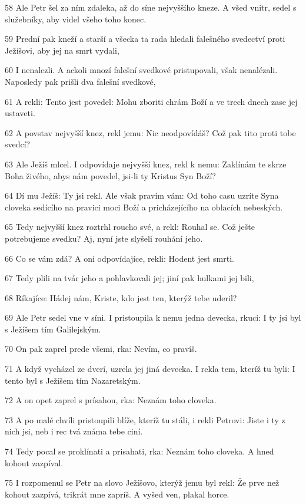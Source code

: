 \par 58 Ale Petr šel za ním zdaleka, až do síne nejvyššího kneze. A všed vnitr, sedel s služebníky, aby videl všeho toho konec.
\par 59 Prední pak kneží a starší a všecka ta rada hledali falešného svedectví proti Ježíšovi, aby jej na smrt vydali,
\par 60 I nenalezli. A ackoli mnozí falešní svedkové pristupovali, však nenalézali. Naposledy pak prišli dva falešní svedkové,
\par 61 A rekli: Tento jest povedel: Mohu zboriti chrám Boží a ve trech dnech zase jej ustaveti.
\par 62 A povstav nejvyšší knez, rekl jemu: Nic neodpovídáš? Což pak tito proti tobe svedcí?
\par 63 Ale Ježíš mlcel. I odpovídaje nejvyšší knez, rekl k nemu: Zaklínám te skrze Boha živého, abys nám povedel, jsi-li ty Kristus Syn Boží?
\par 64 Dí mu Ježíš: Ty jsi rekl. Ale však pravím vám: Od toho casu uzríte Syna cloveka sedícího na pravici moci Boží a pricházejícího na oblacích nebeských.
\par 65 Tedy nejvyšší knez roztrhl roucho své, a rekl: Rouhal se. Což ješte potrebujeme svedku? Aj, nyní jste slyšeli rouhání jeho.
\par 66 Co se vám zdá? A oni odpovídajíce, rekli: Hodent jest smrti.
\par 67 Tedy plili na tvár jeho a pohlavkovali jej; jiní pak hulkami jej bili,
\par 68 Ríkajíce: Hádej nám, Kriste, kdo jest ten, kterýž tebe uderil?
\par 69 Ale Petr sedel vne v síni. I pristoupila k nemu jedna devecka, rkuci: I ty jsi byl s Ježíšem tím Galilejským.
\par 70 On pak zaprel prede všemi, rka: Nevím, co pravíš.
\par 71 A když vycházel ze dverí, uzrela jej jiná devecka. I rekla tem, kteríž tu byli: I tento byl s Ježíšem tím Nazaretským.
\par 72 A on opet zaprel s prísahou, rka: Neznám toho cloveka.
\par 73 A po malé chvíli pristoupili blíže, kteríž tu stáli, i rekli Petrovi: Jiste i ty z nich jsi, neb i rec tvá známa tebe ciní.
\par 74 Tedy pocal se proklínati a prisahati, rka: Neznám toho cloveka. A hned kohout zazpíval.
\par 75 I rozpomenul se Petr na slovo Ježíšovo, kterýž jemu byl rekl: Že prve než kohout zazpívá, trikrát mne zapríš. A vyšed ven, plakal horce.

